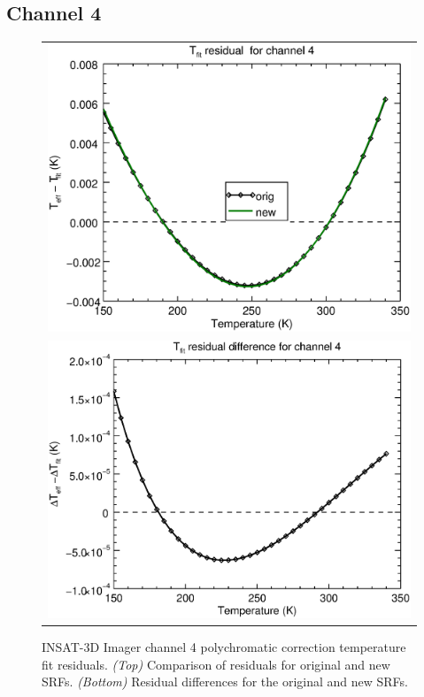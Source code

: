 \subsection{Channel 4}
\begin{figure}[H]
  \centering
  \begin{tabular}{c}
    \includegraphics[scale=0.55]{graphics/imgr/tfit/imgr_insat3d-4.tfit.eps} \\
    \includegraphics[scale=0.55]{graphics/imgr/tfit/imgr_insat3d-4.tfit.difference.eps}
  \end{tabular}
  \caption{INSAT-3D Imager channel 4 polychromatic correction temperature fit residuals. \emph{(Top)} Comparison of residuals for original and new SRFs. \emph{(Bottom)} Residual differences for the original and new SRFs.}
  \label{fig:imgr_ch4_tfit}
\end{figure}


